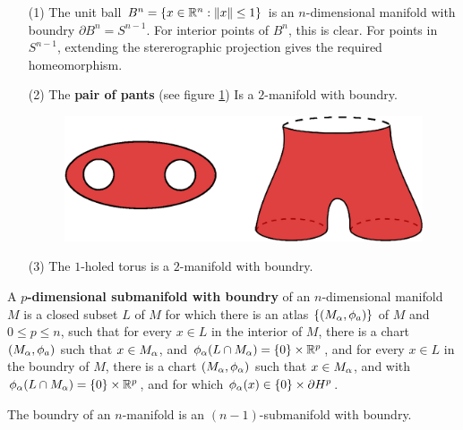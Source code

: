 \begin{example}\label{example_1.3}
    \begin{enumerate}
        \item[(1)] The unit ball $B^n=\{x \in \mathbb{R}^n : \|x\| \leq 1\}$ is an
            $n$-dimensional manifold with boundry  $\partial{B^n}=S^{n-1}$. For
            interior points of $B^n$, this is clear. For points in  $S^{n-1}$,
            extending the stererographic projection gives the required
            homeomorphism.

        \item[(2)] The \textbf{pair of pants} (see figure \ref{fig_1.3}) Is a
            $2$-manifold with boundry.
             \begin{figure}[h]
                \centering
                \includegraphics[scale=0.5]{Figures/Chapter1/pair_of_pants.eps}
                \caption{}
                \label{fig_1.3}
            \end{figure}

        \item[(3)] The $1$-holed torus is a  $2$-manifold with boundry.
    \end{enumerate}
\end{example}

\begin{definition}
    A \textbf{$p$-dimensional submanifold with boundry} of an $n$-dimensional
    manifold  $M$ is a closed subset  $L$ of  $M$ for which there is an atlas
    $\{(M_\alpha,\phi_a)\}$ of $M$ and  $0 \leq p \leq n$, such that for every $x
    \in L$ in the interior of  $M$, there is a chart  $(M_\alpha,\phi_a)$ such that
    $x \in M_\alpha$, and  $\phi_\alpha(L \cap M_\alpha)=\{0\} \times \mathbb{R}^p$, and for every
    $x \in L$ in the boundry of  $M$, there is a chart  $(M_\alpha,\phi_\alpha)$ such
    that $x \in M_\alpha$, and with  $\phi_\alpha(L \cap M_\alpha)=\{0\} \times \mathbb{R}^p$, and
    for which $\phi_\alpha(x) \in \{0\} \times \partial{H^p}$.
\end{definition}

\begin{lemma}\label{1.1.2}
    The boundry of an $n$-manifold is an $(n-1)$-submanifold with boundry.
\end{lemma}

